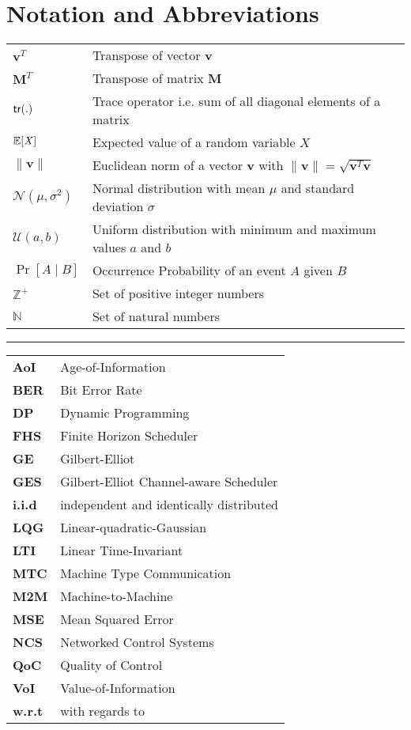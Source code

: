\chapter*{Notation and Abbreviations}

\begin{tabular}{p{2cm} l} 
$\boldsymbol{v}^T$ & Transpose of vector $\boldsymbol{v}$\\
$\boldsymbol{M}^T$ & Transpose of matrix $\boldsymbol{M}$\\
$\mathsf{tr}(.)$ & Trace operator i.e. sum of all diagonal elements of a matrix\\
$\mathbb{E}[\mathit{X}]$ & Expected value of a random variable $\mathit{X}$\\
$\|\boldsymbol{v}\|$ & Euclidean norm of a vector $\boldsymbol{v}$ with $\|\boldsymbol{v}\|=\sqrt{\boldsymbol{v} ^T\boldsymbol{v}}$\\
$\mathcal{N}(\mu,\sigma^2)$ & Normal distribution with mean $\mu$ and standard deviation $\sigma$\\
$\mathcal{U}(a,b)$ & Uniform distribution with minimum and maximum values $a$ and $b$\\
$\Pr\left[A \mid B \right]$ & Occurrence Probability of an event $A$ given $B$\\
$\mathbb{Z}^+$ & Set of positive integer numbers\\
$\mathbb{N}$ & Set of natural numbers\\
\end{tabular}
\vspace{1cm}

\hrule
\vspace{1cm}
  
\begin{tabular}{>{\bfseries}p{2cm} l}
AoI & Age-of-Information\\
BER & Bit Error Rate\\
DP & Dynamic Programming\\
FHS & Finite Horizon Scheduler\\
GE & Gilbert-Elliot\\
GES & Gilbert-Elliot Channel-aware Scheduler\\
i.i.d & independent and identically distributed\\
LQG & Linear-quadratic-Gaussian\\
LTI & Linear Time-Invariant\\
MTC & Machine Type Communication\\
M2M & Machine-to-Machine\\
MSE & Mean Squared Error\\
NCS & Networked Control Systems\\
QoC & Quality of Control\\
VoI & Value-of-Information\\
w.r.t & with regards to\\
\end{tabular}
